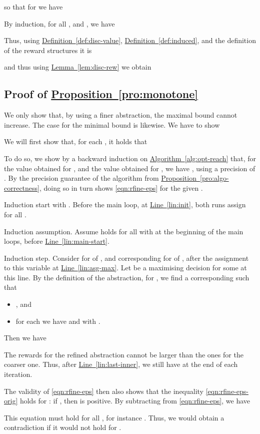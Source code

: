 \documentclass[10pt,twocolumn]{article}
\newcommand{\refdef}[1]{\texorpdfstring{\hyperref[def:#1]{Definition~\ref*{def:#1}}}{Definition \ref*{def:#1}}}
\newcommand{\reflem}[1]{\texorpdfstring{\hyperref[lem:#1]{Lemma~\ref*{lem:#1}}}{Lemma~\ref*{lem:#1}}}
\newcommand{\refpro}[1]{\texorpdfstring{\hyperref[pro:#1]{Proposition~\ref*{pro:#1}}}{Proposition~\ref*{pro:#1}}}
\newcommand{\refeqn}[1]{\texorpdfstring{\hyperref[eqn:#1]{\eqref{eqn:#1}}}{\eqref{eqn:#1}}}
\newcommand{\refalg}[1]{\texorpdfstring{\hyperref[alg:#1]{Algorithm~\ref*{alg:#1}}}{Algorithm~\ref*{alg:#1}}}
\newcommand{\reflin}[1]{\texorpdfstring{\hyperref[lin:#1]{Line~\ref*{lin:#1}}}{Line~\ref*{lin:#1}}}
\begin{document}
so that for  we have

By induction, for all , and , we have

Thus, using \refdef{disc-value}, \refdef{induced}, and the definition of the reward structures  it is

and thus using \reflem{disc-rew} we obtain


\subsection*{Proof of \refpro{monotone}}
\label{apx:monotone}
\noindent
We only show that, by using a finer abstraction, the maximal bound cannot increase.
The case for the minimal bound is likewise.
We have to show


We will first show that, for each , it holds that

To do so, we show by a backward induction on \refalg{opt-reach} that, for the value  obtained for , and the value  obtained for , we have , using a precision of .
By the precision guarantee of the algorithm from \refpro{algo-correctness}, doing so in turn shows \refeqn{rfine-eps} for the given .

Induction start with . Before the main loop, at \reflin{init}, both runs assign  for all .

Induction assumption. Assume  holds
for all  with 
at the beginning of the main loops, before \reflin{main-start}.

Induction step. Consider  for  of , and corresponding  for  of , after the assignment to this variable at \reflin{asg-max}.
Let  be a maximising decision for some  at this line.
By the definition of the abstraction, for , we find a corresponding  such that
\begin{itemize}
\item , and
\item for each  we have  and  with .
\end{itemize}
Then we have

The rewards for the refined abstraction cannot be larger than the ones for the coarser one.
Thus, after \reflin{last-inner}, we still have  at the end of each iteration.

The validity of \refeqn{rfine-eps} then also shows that the inequality \refeqn{rfine-eps-orig} holds for :
if , then  is positive.
By subtracting  from \refeqn{rfine-eps}, we have

This equation must hold for all , for instance .
Thus, we would obtain a contradiction if it would not hold for .
\end{document}
